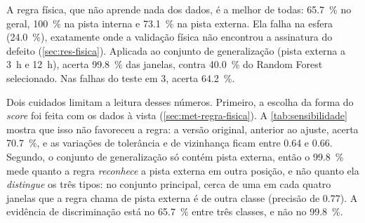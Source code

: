 A regra física, que não aprende nada dos dados, é a melhor de todas:
\SI{65.7}{\percent} no geral, \SI{100}{\percent} na pista interna e
\SI{73.1}{\percent} na pista externa. Ela falha na esfera (\SI{24.0}{\percent}),
exatamente onde a validação física não encontrou a assinatura do defeito
(\autoref{sec:res-fisica}). Aplicada ao conjunto de generalização (pista externa a
3~h e 12~h), acerta \SI{99.8}{\percent} das janelas, contra \SI{40.0}{\percent} do
Random Forest selecionado. Nas falhas do teste em \SI{3}{\hp}, acerta
\SI{64.2}{\percent}.

Dois cuidados limitam a leitura desses números. Primeiro, a escolha da forma do
\emph{score} foi feita com os dados à vista (\autoref{sec:met-regra-fisica}). A
\autoref{tab:sensibilidade} mostra que isso não favoreceu a regra: a versão
original, anterior ao ajuste, acerta \SI{70.7}{\percent}, e as variações de
tolerância e de vizinhança ficam entre \num{0.64} e \num{0.66}. Segundo, o
conjunto de generalização só contém pista externa, então o \SI{99.8}{\percent}
mede quanto a regra \emph{reconhece} a pista externa em outra posição, e não
quanto ela \emph{distingue} os três tipos: no conjunto principal, cerca de uma em
cada quatro janelas que a regra chama de pista externa é de outra classe
(precisão de \num{0.77}). A evidência de discriminação está no
\SI{65.7}{\percent} entre três classes, e não no \SI{99.8}{\percent}.

